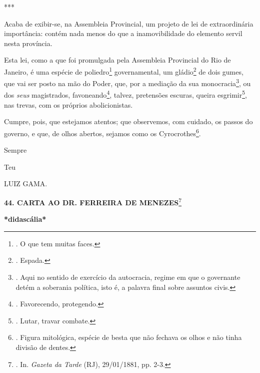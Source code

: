 ***

Acaba de exibir-se, na Assembleia Provincial, um projeto de lei de
extraordinária importância: contém nada menos do que a inamovibilidade
do elemento servil nesta província.

Esta lei, como a que foi promulgada pela Assembleia Provincial do Rio de
Janeiro, é uma espécie de poliedro\footnote{. O que tem muitas faces.}
governamental, um gládio\footnote{. Espada.} de dois gumes, que vai ser
posto na mão do Poder, que, por a mediação da sua monocracia\footnote{.
  Aqui no sentido de exercício da autocracia, regime em que o governante
  detém a soberania política, isto é, a palavra final sobre assuntos
  civis.}, ou dos \emph{seus} magistrados, favoneando\footnote{.
  Favorecendo, protegendo.}, talvez, pretensões escuras, queira
esgrimir\footnote{. Lutar, travar combate.}, nas trevas, com os próprios
abolicionistas.

Cumpre, pois, que estejamos atentos; que observemos, com cuidado, os
passos do governo, e que, de olhos abertos, sejamos como os
Cyrocrothes\footnote{. Figura mitológica, espécie de besta que não
  fechava os olhos e não tinha divisão de dentes.}.

Sempre

Teu

LUIZ GAMA.

\textbf{44. CARTA AO DR. FERREIRA DE MENEZES}\footnote{. In.
  \emph{Gazeta da Tarde} (RJ), 29/01/1881, pp. 2-3.}

\textbf{*didascália*}

